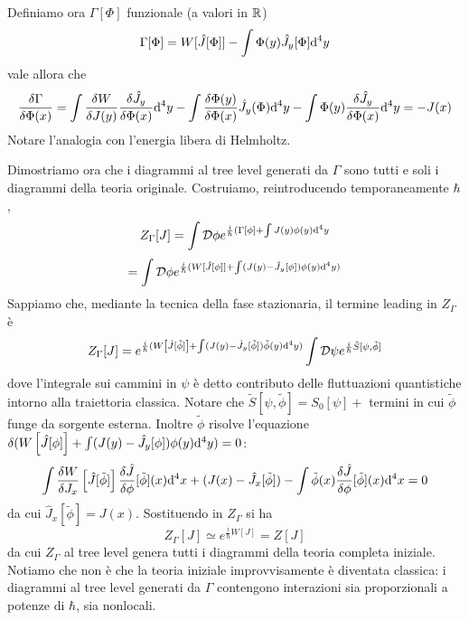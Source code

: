 \documentclass[a4paper, 11pt]{article}
\begin{document}
	Definiamo ora $\Gamma[\Phi]$ funzionale (a valori in $\mathbb{R}$)
	\[ \Gamma[\Phi] = W[\hat{J}[\Phi]] - \int \Phi(y)\hat{J}_y[\Phi] \mathrm{d}^4y \]
	vale allora che
	\[ \frac{\delta\Gamma}{\delta\Phi(x)} = \int \frac{\delta W}{\delta J(y)} \frac{\delta \hat{J}_y}{\delta \Phi(x)} \mathrm{d}^4y - \int  \frac{\delta\Phi(y)}{\delta\Phi(x)} \hat{J}_y(\Phi) \mathrm{d}^4y - \int \Phi(y) \frac{\delta\hat{J}_y}{\delta\Phi(x)}\mathrm{d}^4y = -J(x) \]
	Notare l'analogia con l'energia libera di Helmholtz.%
	
	Dimostriamo ora che i diagrammi al tree level generati da $\Gamma$ sono tutti e soli i diagrammi della teoria originale.
	Costruiamo, reintroducendo temporaneamente $\hbar$,
	\[ Z_\Gamma[J] = \int \mathcal{D}\phi e^{\frac{i}{\hbar} (\Gamma[\phi] + \int J(y)\phi(y) \mathrm{d}^4y} \]
	\[ = \int \mathcal{D}\phi e^{\frac{i}{\hbar} (W[\hat{J}[\phi]] + \int (J(y)-\hat{J}_y[\phi])\phi(y) \mathrm{d}^4y)} \]
	Sappiamo che, mediante la tecnica della fase stazionaria, il termine leading in $Z_\Gamma$ è
	\[ Z_\Gamma[J] = e^{\frac{i}{\hbar} (W\left[\hat{J}[\tilde{\phi}]\right] + \int (J(y)-\hat{J}_y[\tilde{\phi}])\tilde{\phi}(y) \mathrm{d}^4y)} \int\mathcal{D}\psi e^{\frac{i}{\hbar}\tilde{S}[\psi, \tilde{\phi}]} \]
	dove l'integrale sui cammini in $\psi$ è detto contributo delle fluttuazioni quantistiche intorno alla traiettoria classica. Notare che $\tilde{S}[\psi,\tilde{\phi}] = S_0[\psi] +$ termini in cui $\tilde{\phi}$ funge da sorgente esterna. Inoltre $\tilde{\phi}$ risolve l'equazione $\delta(W\left[\hat{J}[\phi]\right] + \int (J(y)-\hat{J}_y[\phi])\phi(y) \mathrm{d}^4y)=0$:
	\[ \int\frac{\delta W}{\delta J_x}\left[\hat{J}[\tilde{\phi}]\right] \frac{\delta \hat{J}}{\delta \phi} [\tilde{\phi}](x) \mathrm{d}^4x + (J(x)-\hat{J}_x[\tilde{\phi}]) - \int \tilde{\phi}(x)\frac{\delta\hat{J}}{\delta\phi}[\tilde{\phi}](x) \mathrm{d}^4x = 0 \]
	da cui $\hat{J}_x[\tilde{\phi}] = J(x)$. Sostituendo in $Z_\Gamma$ si ha
	\[ Z_\Gamma[J] \simeq e^{\frac{i}{\hbar} W[J]} = Z[J] \]
	da cui $Z_\Gamma$ al tree level genera tutti i diagrammi della teoria completa iniziale. Notiamo che non è che la teoria iniziale improvvisamente è diventata classica: i diagrammi al tree level generati da $\Gamma$ contengono interazioni sia proporzionali a potenze di $\hbar$, sia nonlocali.
	
	
	
\end{document}
